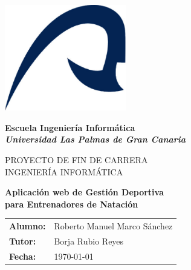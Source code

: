 %
%

%

\begin{titlepage}

	\begin{center}

		\includegraphics[width=200px]{./eps/logo_ulpgc.eps}
		\vspace{2cm}

		{\Large{\textbf{Escuela Ingeniería Informática}}}
		\\
		{\it \large{\textbf{Universidad Las Palmas de Gran Canaria}}}
		\vspace{1cm}

		{\large PROYECTO DE FIN DE CARRERA\\INGENIERÍA INFORMÁTICA}
		\vspace{1cm}

		\textbf{\Large Aplicación web de Gestión Deportiva\\para Entrenadores de Natación}
		\vspace{4cm}
	\end{center}

	\begin{flushright}
		\begin{tabular}{ll}
			\large{\textbf{Alumno:}}	&
			\large{Roberto Manuel Marco Sánchez} \\

			\large{\textbf{Tutor:}}	&
			\large{Borja Rubio Reyes} \\

			\large{\textbf{Fecha:}}	&
			\large{\today} \\
		\end{tabular}
	\end{flushright}

\end{titlepage}
